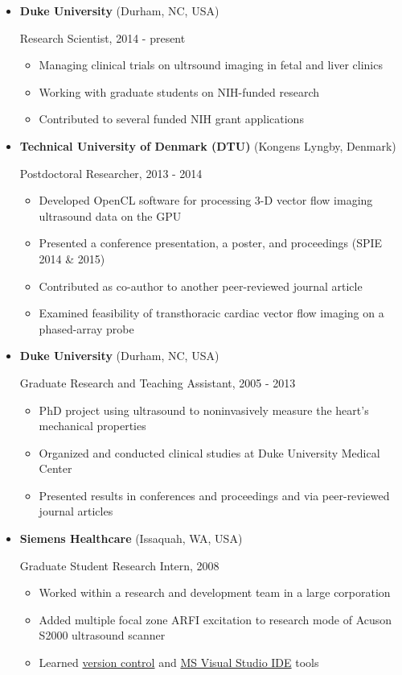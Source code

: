 \documentclass[
]{article}
\providecommand{\tightlist}{%
  \setlength{\itemsep}{0pt}\setlength{\parskip}{0pt}}
\begin{document}
\begin{itemize}
\item
  \textbf{Duke University} (Durham, NC, USA)

  Research Scientist, 2014 - present

  \begin{itemize}
  \tightlist
  \item
    Managing clinical trials on ultrsound imaging in fetal and liver
    clinics
  \item
    Working with graduate students on NIH-funded research
  \item
    Contributed to several funded NIH grant applications
  \end{itemize}
\item
  \textbf{Technical University of Denmark (DTU)} (Kongens Lyngby,
  Denmark)

  Postdoctoral Researcher, 2013 - 2014

  \begin{itemize}
  \tightlist
  \item
    Developed OpenCL software for processing 3-D vector flow imaging
    ultrasound data on the GPU
  \item
    Presented a conference presentation, a poster, and proceedings (SPIE
    2014 \& 2015)
  \item
    Contributed as co-author to another peer-reviewed journal article
  \item
    Examined feasibility of transthoracic cardiac vector flow imaging on
    a phased-array probe
  \end{itemize}
\item
  \textbf{Duke University} (Durham, NC, USA)

  Graduate Research and Teaching Assistant, 2005 - 2013

  \begin{itemize}
  \tightlist
  \item
    PhD project using ultrasound to noninvasively measure the heart's
    mechanical properties
  \item
    Organized and conducted clinical studies at Duke University Medical
    Center
  \item
    Presented results in conferences and proceedings and via
    peer-reviewed journal articles
  \end{itemize}
\item
  \textbf{Siemens Healthcare} (Issaquah, WA, USA)

  Graduate Student Research Intern, 2008

  \begin{itemize}
  \tightlist
  \item
    Worked within a research and development team in a large corporation
  \item
    Added multiple focal zone ARFI excitation to research mode of Acuson
    S2000 ultrasound scanner
  \item
    Learned
    \href{http://www-03.ibm.com/software/products/en/clearcase}{version
    control} and \href{http://www.visualstudio.com/}{MS Visual Studio
    IDE} tools
  \end{itemize}
\end{itemize}
\end{document}
